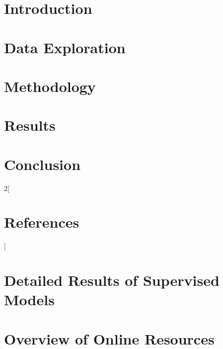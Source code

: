\documentclass[NOTE, disdraft=false, UKenglish]{\DISCDTLATEXPATH UCLCDTDISdoc}
\begin{document}
\maketitle

\tableofcontents

\clearpage

\newpage
\section{Introduction}
\label{sec:introduction}


\section{Data Exploration}
\label{sec:data}


\section{Methodology}
\label{sec:methodology}


\section{Results}
\label{sec:results}


\section{Conclusion}
\label{sec:conclusion}


\nocite{*}
\begin{multicols}{2}[\section*{References}]
\printbibliography[heading=none]
\end{multicols}

\begin{appendices}
	\section{Detailed Results of Supervised Models}
	\label{app:detailed-results}
	

	\section{Overview of Online Resources}
	\label{app:online-overview}
	
\end{appendices}
\end{document}
